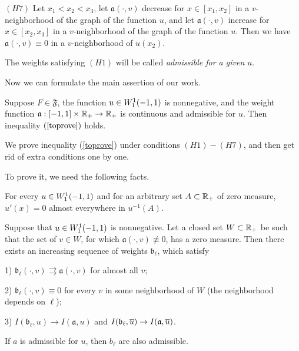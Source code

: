 \bigskip
\noindent
$(H7)$ Let $x_1 < x_2 < x_3$,
let $\mathfrak a(\cdot, v)$ decrease for $x \in [x_1, x_2]$ in a $v$-neighborhood of the graph of the function $u$,
and let $\mathfrak a(\cdot, v)$ increase for $x \in [x_2, x_3]$ in a $v$-neighborhood of the graph of the function $u$.
Then we have $\mathfrak a(\cdot, v) \equiv 0$ in a $v$-neighborhood of $u(x_2)$.

\bigskip

The weights satisfying $(H1)$ will be called \textit{admissible for a given $u$}.

\medskip

Now we can formulate the main assertion of our work.
\begin{thm}
\label{unbounded_growth_thm}
Suppose $F \in \mathfrak{F}$, the function $u \in W_1^1(-1, 1)$ is nonnegative,
and the weight function $\mathfrak a: [-1, 1] \times \mathbb R_+ \to \mathbb R_+$ is continuous
and admissible for $u$.
Then inequality $(\ref{toprove})$ holds.
\end{thm}

We prove inequality (\ref{toprove}) under conditions $(H1)-(H7)$,
and then get rid of extra conditions one by one.

To prove it, we need the following facts.

\begin{prop}
\label{levelDerivative}
\textrm{\cite[Theorem 6.19]{LiebLoss} }
For every $u \in W_1^1(-1, 1)$ and for an arbitrary set $A \subset \mathbb R_+$ of zero measure,
$u'(x) = 0$ almost everywhere in $u^{-1}(A)$.
\end{prop}

\begin{lm}
\label{zeroApprox}
Suppose that $u \in W_1^1(-1, 1)$ is nonnegative.
Let a closed set $W \subset \mathbb R_+$ be such that
the set of $v \in W$, for which $\mathfrak a(\cdot, v) \not\equiv 0$, has a zero measure.
Then there exists an increasing sequence of weights $\mathfrak b_{\ell}$, which satisfy

1) $\mathfrak b_{\ell}(\cdot, v) \rightrightarrows \mathfrak a(\cdot, v)$ for almost all $v$;

2) $\mathfrak b_{\ell}(\cdot, v) \equiv 0$ for every $v$ in some neighborhood of $W$ (the neighborhood depends on $\ell$);

3) $I(\mathfrak b_{\ell}, u) \to I(\mathfrak a, u)$ and $I(\mathfrak b_{\ell}, \mon{u}) \to I(\mathfrak a, \mon{u})$.
\end{lm}

\begin{rem}
If $a$ is admissible for $u$, then $b_{\ell}$ are also admissible.
\end{rem}

